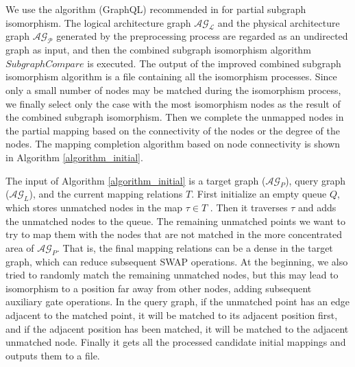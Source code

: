 \documentclass[runningheads]{llncs}
\begin{document}
We use the algorithm (GraphQL) recommended in \cite{Sun2020} for partial subgraph isomorphism.
The logical architecture graph $\mathcal{AG_{L}}$ 
and the physical architecture graph $\mathcal{AG_{P}}$ generated by the preprocessing process 
are regarded as an undirected graph as input, and then the combined subgraph isomorphism algorithm $SubgraphCompare$ is executed. 
The output of the improved combined subgraph isomorphism algorithm is a file containing all the isomorphism processes.
Since only a small number of nodes may be matched during the isomorphism process, we finally select only the case 
with the most isomorphism nodes as the result of the combined subgraph isomorphism.
Then we complete the unmapped nodes in the partial mapping based on the connectivity of 
the nodes or the degree of the nodes. 
The mapping completion algorithm based on node connectivity is shown in Algorithm \ref{algorithm_initial}.

The input of Algorithm \ref{algorithm_initial} is a target graph ($\mathcal{AG}_{P}$), 
query graph ($\mathcal{AG}_{L}$), and the current mapping relations $T$.
First initialize an empty queue $Q$, which stores unmatched nodes in the map $\tau \in T$ .
Then it traverses $\tau$ and adds the unmatched nodes to the queue. 
The remaining unmatched points we want to try to map them with the nodes that are not 
matched in the more concentrated area of $\mathcal{AG}_{P}$.
That is, 
the final mapping relations can be a dense in the target graph, 
which can reduce subsequent SWAP operations. 
At the beginning, we also tried to randomly match the remaining unmatched nodes, 
but this may lead to isomorphism to a position far away from other nodes, 
adding subsequent auxiliary gate operations.
In the query graph, if the unmatched point has an edge adjacent to the matched point, 
it will be matched to its adjacent position first, 
and if the adjacent position has been matched, 
it will be matched to the adjacent unmatched node.
Finally it gets all the processed candidate initial mappings and outputs them to a file.
\end{document}
